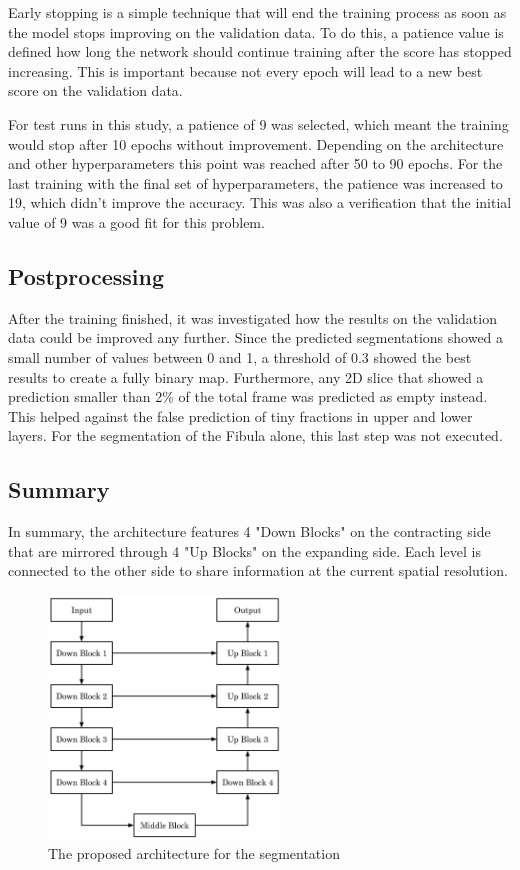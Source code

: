 Early stopping is a simple technique that will end the training process as soon as the model stops improving on the validation data. To do this, a patience value is defined how long the network should continue training after the score has stopped increasing. This is important because not every epoch will lead to a new best score on the validation data.

For test runs in this study, a patience of 9 was selected, which meant the training would stop after 10 epochs without improvement. Depending on the architecture and other hyperparameters this point was reached after 50 to 90 epochs. For the last training with the final set of hyperparameters, the patience was increased to 19, which didn't improve the accuracy.  This was also a verification that the initial value of 9 was a good fit for this problem.

\subsection{Postprocessing}

After the training finished, it was investigated how the results on the validation data could be improved any further. Since the predicted segmentations showed a small number of values between 0 and 1, a threshold of 0.3 showed the best results to create a fully binary map. Furthermore, any 2D slice that showed a prediction smaller than 2\% of the total frame was predicted as empty instead. This helped against the false prediction of tiny fractions in upper and lower layers. For the segmentation of the Fibula alone, this last step was not executed.

\subsection{Summary}

In summary, the architecture features 4 "Down Blocks" on the contracting side that are mirrored through 4 "Up Blocks" on the expanding side. Each level is connected to the other side to share information at the current spatial resolution.

\begin{figure}[H]
\centering
\par
\includegraphics[width=0.55\textwidth]{imgs/model.png}
\caption{The proposed architecture for the segmentation}
\par
\end{figure}

